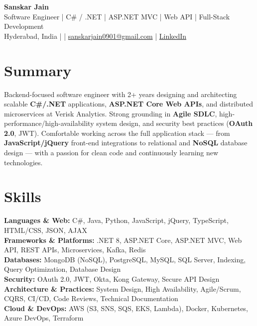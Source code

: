 \documentclass[10pt,letterpaper]{article}
\begin{document}
\begin{center}
    {\Large \textbf{Sanskar Jain}} \\
    Software Engineer \;|\; C\# / .NET \;|\; ASP.NET MVC \;|\; Web API \;|\; Full-Stack Development \\
    Hyderabad, India \enspace |  \enspace | \enspace
    \href{mailto:sanskarjain0901@gmail.com}{sanskarjain0901@gmail.com} \enspace | \enspace
    \href{https://www.linkedin.com/in/sanskar-jain0901/}{LinkedIn}
\end{center}

\vspace{2pt}

\section*{Summary}
Backend-focused software engineer with 2+ years designing and architecting scalable \textbf{C\#/.NET} applications, \textbf{ASP.NET Core Web APIs}, and distributed microservices at Verisk Analytics. Strong grounding in \textbf{Agile SDLC}, high-performance/high-availability system design, and security best practices (\textbf{OAuth 2.0}, JWT). Comfortable working across the full application stack --- from \textbf{JavaScript/jQuery} front-end integrations to relational and \textbf{NoSQL} database design --- with a passion for clean code and continuously learning new technologies.

\section*{Skills}
\textbf{Languages \& Web:} C\#, Java, Python, JavaScript, jQuery, TypeScript, HTML/CSS, JSON, AJAX \\
\textbf{Frameworks \& Platforms:} .NET 8, ASP.NET Core, ASP.NET MVC, Web API, REST APIs, Microservices, Kafka, Redis \\
\textbf{Databases:} MongoDB (NoSQL), PostgreSQL, MySQL, SQL Server, Indexing, Query Optimization, Database Design \\
\textbf{Security:} OAuth 2.0, JWT, Okta, Kong Gateway, Secure API Design \\
\textbf{Architecture \& Practices:} System Design, High Availability, Agile/Scrum, CQRS, CI/CD, Code Reviews, Technical Documentation \\
\textbf{Cloud \& DevOps:} AWS (S3, SNS, SQS, EKS, Lambda), Docker, Kubernetes, Azure DevOps, Terraform
\end{document}

